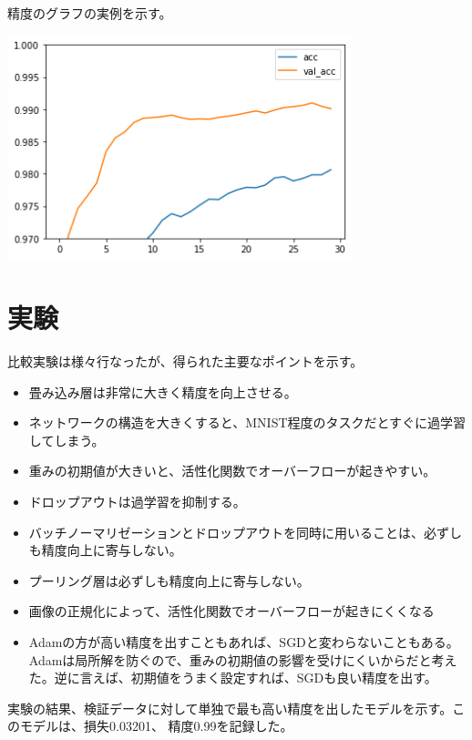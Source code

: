 \documentclass[platex,dvipdfmx]{jsarticle}
\begin{document}
精度のグラフの実例を示す。

\includegraphics[width=10cm]{acc.png}

\newpage

\section{実験}

比較実験は様々行なったが、得られた主要なポイントを示す。

\begin{itemize}
  \item 畳み込み層は非常に大きく精度を向上させる。
  \item ネットワークの構造を大きくすると、MNIST程度のタスクだとすぐに過学習してしまう。
  \item 重みの初期値が大きいと、活性化関数でオーバーフローが起きやすい。
  \item ドロップアウトは過学習を抑制する。
  \item バッチノーマリゼーションとドロップアウトを同時に用いることは、必ずしも精度向上に寄与しない。
  \item プーリング層は必ずしも精度向上に寄与しない。
  \item 画像の正規化によって、活性化関数でオーバーフローが起きにくくなる
  \item Adamの方が高い精度を出すこともあれば、SGDと変わらないこともある。Adamは局所解を防ぐので、重みの初期値の影響を受けにくいからだと考えた。逆に言えば、初期値をうまく設定すれば、SGDも良い精度を出す。
\end{itemize}

実験の結果、検証データに対して単独で最も高い精度を出したモデルを示す。このモデルは、損失0.03201、
精度0.99を記録した。
\end{document}

